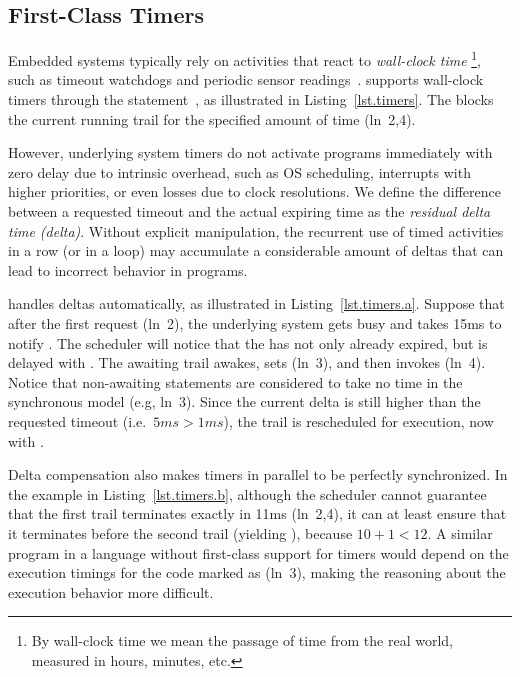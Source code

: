 \subsection{ First-Class Timers }
\label{sec.ceu.timers}

Embedded systems typically rely on activities that react to
\emph{wall-clock time}%
\footnote{
By wall-clock time we mean the passage of time from the real world, measured in 
hours, minutes, etc.
}, such as timeout watchdogs and periodic sensor readings~\cite{esterel.delays}.
%
\CEU supports wall-clock timers through the 
statement~\cite{ceu.tecs17}, as illustrated in Listing~\ref{lst.timers}.
The  blocks the current running trail for the specified amount of
time (ln~2,4).

However, underlying system timers do not activate programs immediately with
zero delay due to intrinsic overhead, such as OS scheduling, interrupts with
higher priorities, or even losses due to clock resolutions.
%
We define the difference between a requested timeout and the actual expiring 
time as the \emph{residual delta time (delta)}.
Without explicit manipulation, the recurrent use of timed activities in a row 
(or in a loop) may accumulate a considerable amount of deltas that can lead to 
incorrect behavior in programs.

\CEU handles deltas automatically, as illustrated in Listing~\ref{lst.timers.a}.
Suppose that after the first  request (ln~2), the underlying
system gets busy and takes 15ms to notify \CEU.
%
The scheduler will notice that the  has not only already expired,
but is delayed with .
The awaiting trail awakes, sets  (ln~3), and then invokes
 (ln~4).
%
Notice that non-awaiting statements are considered to take no time in the
synchronous model (e.g, ln~3).
%
Since the current delta is still higher than the requested timeout
(i.e.~$5ms>1ms$), the trail is rescheduled for execution, now with
.

Delta compensation also makes timers in parallel to be perfectly synchronized.
%
In the example in Listing~\ref{lst.timers.b}, although the scheduler cannot
guarantee that the first trail terminates exactly in 11ms (ln~2,4), it can at
least ensure that it terminates before the second trail (yielding ),
because $10+1<12$.
%
A similar program in a language without first-class support for timers would 
depend on the execution timings for the code marked as  (ln~3),
making the reasoning about the execution behavior more difficult.


